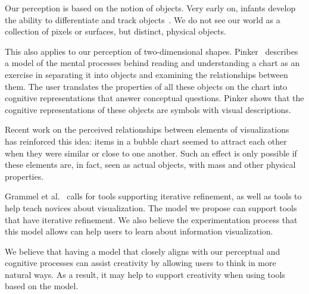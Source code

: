 \label{cognitiveModel}

Our perception is based on the notion of objects.
Very early on, infants develop the ability to differentiate and track objects~\cite{Spelke:CogSci:1990}.
We do not see our world as a collection of pixels or surfaces, but distinct, physical objects.

This also applies to our perception of two-dimensional shapes.
Pinker~\cite{Pinker:AIFT:1990} describes a model of the mental processes behind reading and understanding a chart as an exercise in separating it into objects and examining the relationships between them.
The user translates the properties of all these objects on the chart into cognitive representations that answer conceptual questions.
Pinker shows that the cognitive representations of these objects are symbols with visual descriptions.

Recent work on the perceived relationships between elements of visualizations~\cite{Ziemkiewicz:InfoVis:2010} has reinforced this idea: items in a bubble chart seemed to attract each other when they were similar or close to one another.
Such an effect is only possible if these elements are, in fact, seen as actual objects, with mass and other physical properties.

Grammel et al.~\cite{Grammel2010} calls for tools supporting iterative refinement, as well as tools to help teach novices about visualization.
The model we propose can support tools that have iterative refinement.
We also believe the experimentation process that this model allows can help users to learn about information visualization.

We believe that having a model that closely aligns with our perceptual and cognitive processes can assist creativity by allowing users to think in more natural ways.
As a result, it may help to support creativity when using tools based on the model.
\bodysubsection{}
\label{}